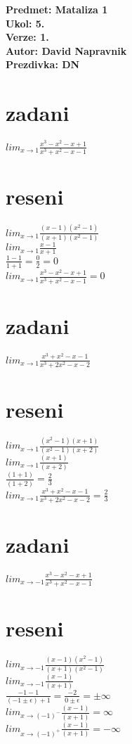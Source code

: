\documentclass[a4paper]{article}
\def\doubleunderline#1{\underline{\underline{#1}}}
\begin{document}
\noindent
\textbf{Predmet: Mataliza 1}\\
\textbf{Ukol: 5.}\\
\textbf{Verze: 1.}\\
\textbf{Autor: David Napravnik}\\
\textbf{Prezdivka: DN}

\section*{zadani}
$lim_{x \rightarrow 1} \frac{x^3-x^2-x+1}{x^3+x^2-x-1}$

\section*{reseni}
$lim_{x \rightarrow 1} \frac{(x-1)(x^2-1)}{(x+1)(x^2-1)}$\\
$lim_{x \rightarrow 1} \frac{x-1}{x+1}$\\
$\frac{1-1}{1+1} = \frac{0}{2} = 0$\\
\doubleunderline{$lim_{x \rightarrow 1} \frac{x^3-x^2-x+1}{x^3+x^2-x-1} = 0$}


\section*{zadani}
$lim_{x \rightarrow 1} \frac{x^3+x^2-x-1}{x^3+2x^2-x-2}$

\section*{reseni}
$lim_{x \rightarrow 1} \frac{(x^2-1)(x+1)}{(x^2-1)(x+2)}$\\
$lim_{x \rightarrow 1} \frac{(x+1)}{(x+2)}$\\
$\frac{(1+1)}{(1+2)} = \frac{2}{3}$\\
\doubleunderline{$lim_{x \rightarrow 1} \frac{x^3+x^2-x-1}{x^3+2x^2-x-2} = \frac{2}{3}$}


\section*{zadani}
$lim_{x \rightarrow -1} \frac{x^3-x^2-x+1}{x^3+x^2-x-1}$

\section*{reseni}
$lim_{x \rightarrow -1} \frac{(x-1)(x^2-1)}{(x+1)(x^2-1)}$\\
$lim_{x \rightarrow -1} \frac{(x-1)}{(x+1)}$\\
$\frac{-1-1}{(-1 \pm \epsilon) + 1} = \frac{-2}{0 \pm \epsilon} = \pm\infty$\\
\doubleunderline{$lim_{x \rightarrow (-1)^-} \frac{(x-1)}{(x+1)} = \infty$}\\
\doubleunderline{$lim_{x \rightarrow (-1)^+} \frac{(x-1)}{(x+1)} = - \infty$}\\
\end{document}
